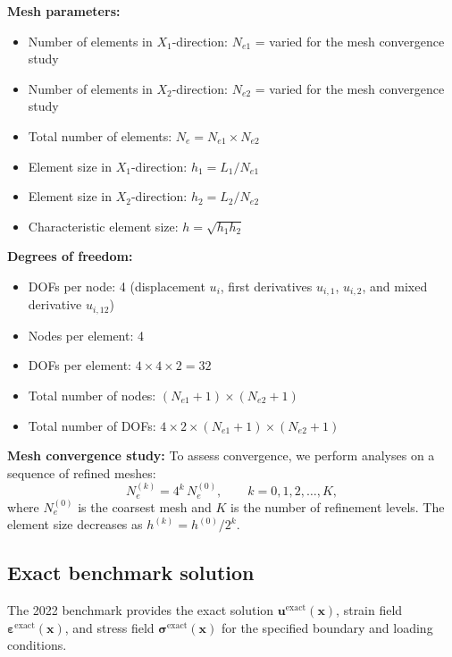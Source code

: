 \documentclass[11pt]{article}
\newcommand{\bx}{\mathbf{x}}
\newcommand{\bx}{\mathbf{x}}
\begin{document}
\textbf{Mesh parameters:}
\begin{itemize}
\item Number of elements in $X_{1}$-direction: $N_{e1}$ = varied for the mesh convergence study
\item Number of elements in $X_{2}$-direction: $N_{e2}$ = varied for the mesh convergence study
\item Total number of elements: $N_{e} = N_{e1}\times N_{e2}$
\item Element size in $X_{1}$-direction: $h_{1} = L_{1}/N_{e1}$
\item Element size in $X_{2}$-direction: $h_{2} = L_{2}/N_{e2}$
\item Characteristic element size: $h = \sqrt{h_{1}h_{2}}$
\end{itemize}

\textbf{Degrees of freedom:}
\begin{itemize}
\item DOFs per node: 4 (displacement $u_{i}$, first derivatives
  $u_{i,1}$, $u_{i,2}$, and mixed derivative $u_{i,12}$)
\item Nodes per element: 4
\item DOFs per element: $4\times 4\times 2 = 32$
\item Total number of nodes: $(N_{e1}+1)\times(N_{e2}+1)$
\item Total number of DOFs: $4\times 2\times (N_{e1}+1)\times(N_{e2}+1)$
\end{itemize}

\textbf{Mesh convergence study:} To assess convergence, we perform
analyses on a sequence of refined meshes:
\begin{equation}
N_{e}^{(k)} = 4^{k}\,N_{e}^{(0)},
\qquad
k=0,1,2,\ldots,K,
\label{s8:mesh_sequence}
\end{equation}
where $N_{e}^{(0)}$ is the coarsest mesh and $K$ is the number of
refinement levels. The element size decreases as $h^{(k)} = h^{(0)}/2^{k}$.

\subsection{Exact benchmark solution}
\label{ssec:exact_solution}

The 2022 benchmark provides the exact solution
$\mathbf{u}^{\mathrm{exact}}(\bx)$, strain field
$\boldsymbol{\varepsilon}^{\mathrm{exact}}(\bx)$, and stress field
$\boldsymbol{\sigma}^{\mathrm{exact}}(\bx)$ for the specified boundary
and loading conditions.
\end{document}
